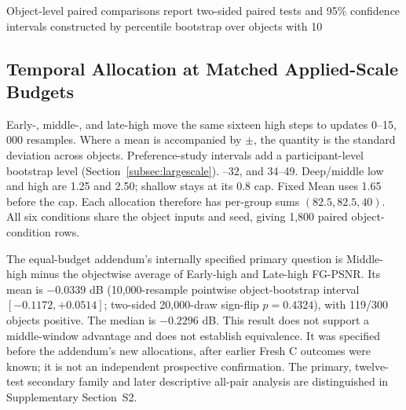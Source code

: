 \documentclass[times,twocolumn,final]{elsarticle}
\providecommand{\DIFadd}[1]{{\protect\color{blue} \sf #1}} %
\providecommand{\DIFdel}[1]{{\protect\color{red} \scriptsize #1}} %
\providecommand{\DIFaddbegin}{} %
\providecommand{\DIFaddend}{} %
\providecommand{\DIFdelbegin}{} %
\providecommand{\DIFdelend}{} %
\begin{document}
\DIFdelbegin %
\DIFdel{Object-level paired comparisons report two-sided paired tests and 95\% confidence intervals constructed by percentile bootstrap over objects with 10}%
\DIFdelend \DIFaddbegin \subsection{Temporal Allocation at Matched Applied-Scale Budgets}
\label{subsec:matched-budget300}
\DIFadd{Early-, middle-, and late-high move the same sixteen high steps to updates 0--15}\DIFaddend , \DIFdelbegin %
\DIFdel{000 resamples. Where a mean is accompanied by $\pm$, the quantity is the standard deviation across objects. Preference-study intervals add a participant-level bootstrap level (Section~\ref{subsec:largescale}).
}\DIFdelend \DIFaddbegin \DIFadd{17--32, and 34--49. Deep/middle low and high are 1.25 and 2.50; shallow stays at its 0.8 cap. Fixed Mean uses 1.65 before the cap. Each allocation therefore has per-group sums $(82.5,82.5,40)$. All six conditions share the object inputs and seed, giving 1,800 paired object-condition rows.
}

\DIFadd{The equal-budget addendum's internally specified primary question is Middle-high minus the objectwise average of Early-high and Late-high FG-PSNR. Its mean is $-0.0339$ dB (10,000-resample pointwise object-bootstrap interval $[-0.1172,+0.0514]$; two-sided 20,000-draw sign-flip $p=0.4324$), with 119/300 objects positive. The median is $-0.2296$ dB. This result does not support a middle-window advantage and does not establish equivalence. It was specified before the addendum's new allocations, after earlier Fresh C outcomes were known; it is not an independent prospective confirmation. The primary, twelve-test secondary family and later descriptive all-pair analysis are distinguished in Supplementary Section~S2.
}\DIFaddend
\end{document}
